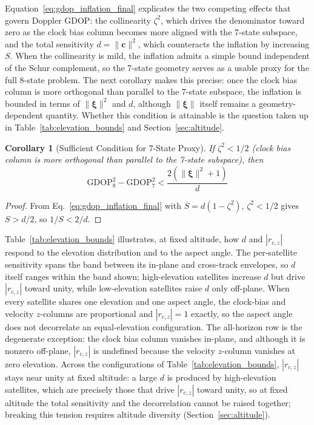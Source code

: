 \documentclass[letterpaper,times]{IONconf-v2}
\theoremstyle{plain}
\newtheorem{corollary}{Corollary}
\theoremstyle{remark}
\begin{document}
Equation~\eqref{eq:gdop_inflation_final} explicates the two competing effects that govern Doppler GDOP: the collinearity $\zeta^2$, which drives the denominator toward zero as the clock bias column becomes more aligned with the 7-state subspace, and the total sensitivity $d = \|\mathbf{c}\|^2$, which counteracts the inflation by increasing $S$. When the collinearity is mild, the inflation admits a simple bound independent of the Schur complement, so the 7-state geometry serves as a usable proxy for the full 8-state problem. The next corollary makes this precise: once the clock bias column is more orthogonal than parallel to the 7-state subspace, the inflation is bounded in terms of $\|\boldsymbol{\xi}\|^2$ and $d$, although $\|\boldsymbol{\xi}\|$ itself remains a geometry-dependent quantity. Whether this condition is attainable is the question taken up in Table~\ref{tab:elevation_bounds} and Section~\ref{sec:altitude}.
\begin{corollary}[Sufficient Condition for 7-State Proxy]\label{cor:proxy_sufficient}
If $\zeta^2 < 1/2$ (clock bias column is more orthogonal than parallel to the 7-state subspace), then
\begin{equation}\label{eq:proxy_bound}
\mathrm{GDOP}_8^2 - \mathrm{GDOP}_7^2 < \frac{2(\|\boldsymbol{\xi}\|^2 + 1)}{d}
\end{equation}
\end{corollary}

\begin{proof}
From Eq.~\eqref{eq:gdop_inflation_final} with $S = d(1-\zeta^2)$, $\zeta^2 < 1/2$ gives $S > d/2$, so $1/S < 2/d$.
\end{proof}

Table~\ref{tab:elevation_bounds} illustrates, at fixed altitude, how $d$ and $|r_{c,z}|$ respond to the elevation distribution and to the aspect angle. The per-satellite sensitivity spans the band between its in-plane and cross-track envelopes, so $d$ itself ranges within the band shown; high-elevation satellites increase $d$ but drive $|r_{c,z}|$ toward unity, while low-elevation satellites raise $d$ only off-plane. When every satellite shares one elevation and one aspect angle, the clock-bias and velocity $z$-columns are proportional and $|r_{c,z}| = 1$ exactly, so the aspect angle does not decorrelate an equal-elevation configuration. The all-horizon row is the degenerate exception: the clock bias column vanishes in-plane, and although it is nonzero off-plane, $|r_{c,z}|$ is undefined because the velocity $z$-column vanishes at zero elevation. Across the configurations of Table~\ref{tab:elevation_bounds}, $|r_{c,z}|$ stays near unity at fixed altitude: a large $d$ is produced by high-elevation satellites, which are precisely those that drive $|r_{c,z}|$ toward unity, so at fixed altitude the total sensitivity and the decorrelation cannot be raised together; breaking this tension requires altitude diversity (Section~\ref{sec:altitude}).
\end{document}
